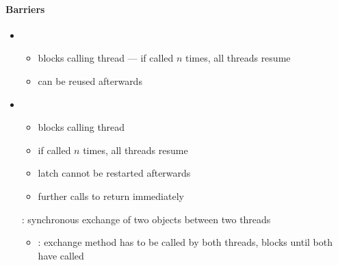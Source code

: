 \paragraph{Barriers}
\begin{itemize}
  \item {}
  \begin{itemize}
    \item {} blocks calling thread --- if called \( n \) times, all threads resume
    \item can be reused afterwards
  \end{itemize}
  \item {}
  \begin{itemize}
    \item {} blocks calling thread
    \item if  called \( n \) times, all threads resume
    \item latch cannot be restarted afterwards
    \item further calls to  return immediately
  \end{itemize}
  : synchronous exchange of two objects between two threads
  \begin{itemize}
    \item {}: exchange method has to be called by both threads, blocks until both have called
  \end{itemize}
\end{itemize}

